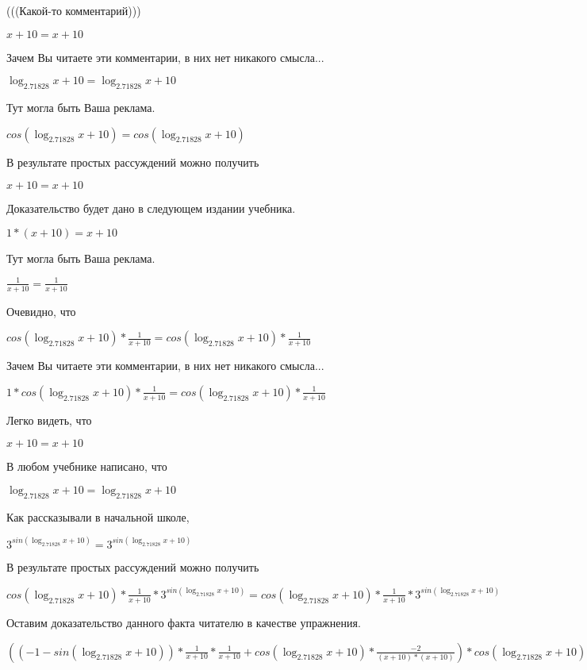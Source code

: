 \documentclass[12pt,a4paper,fleqn]{article}
\theoremstyle{definition}
\begin{document}
(((Какой-то комментарий)))

$ x  +  10  =  x  +  10 $

Зачем Вы читаете эти комментарии, в них нет никакого смысла...

$\log_{ 2.71828 }{ x  +  10 } = \log_{ 2.71828 }{ x  +  10 }$

Тут могла быть Ваша реклама.

$cos(\log_{ 2.71828 }{ x  +  10 }) = cos(\log_{ 2.71828 }{ x  +  10 })$

В результате простых рассуждений можно получить

$ x  +  10  =  x  +  10 $

Доказательство будет дано в следующем издании учебника.

$ 1  * ( x  +  10 ) =  x  +  10 $

Тут могла быть Ваша реклама.

$\frac{ 1 }{ x  +  10 }
 = \frac{ 1 }{ x  +  10 }
$

Очевидно, что

$cos(\log_{ 2.71828 }{ x  +  10 }) * \frac{ 1 }{ x  +  10 }
 = cos(\log_{ 2.71828 }{ x  +  10 }) * \frac{ 1 }{ x  +  10 }
$

Зачем Вы читаете эти комментарии, в них нет никакого смысла...

$ 1  * cos(\log_{ 2.71828 }{ x  +  10 }) * \frac{ 1 }{ x  +  10 }
 = cos(\log_{ 2.71828 }{ x  +  10 }) * \frac{ 1 }{ x  +  10 }
$

Легко видеть, что

$ x  +  10  =  x  +  10 $

В любом учебнике написано, что

$\log_{ 2.71828 }{ x  +  10 } = \log_{ 2.71828 }{ x  +  10 }$

Как рассказывали в начальной школе,

${ 3 }^{sin(\log_{ 2.71828 }{ x  +  10 })} = { 3 }^{sin(\log_{ 2.71828 }{ x  +  10 })}$

В результате простых рассуждений можно получить

$cos(\log_{ 2.71828 }{ x  +  10 }) * \frac{ 1 }{ x  +  10 }
 * { 3 }^{sin(\log_{ 2.71828 }{ x  +  10 })} = cos(\log_{ 2.71828 }{ x  +  10 }) * \frac{ 1 }{ x  +  10 }
 * { 3 }^{sin(\log_{ 2.71828 }{ x  +  10 })}$

Оставим доказательство данного факта читателю в качестве упражнения.

$(( -1  - sin(\log_{ 2.71828 }{ x  +  10 })) * \frac{ 1 }{ x  +  10 }
 * \frac{ 1 }{ x  +  10 }
 + cos(\log_{ 2.71828 }{ x  +  10 }) * \frac{ -2 }{( x  +  10 ) * ( x  +  10 )}
) * cos(\log_{ 2.71828 }{ x  +  10 }) * \frac{ 1 }{ x  +  10 }
 * { 3 }^{sin(\log_{ 2.71828 }{ x  +  10 })} = (( -1  - sin(\log_{ 2.71828 }{ x  +  10 })) * \frac{ 1 }{ x  +  10 }
 * \frac{ 1 }{ x  +  10 }
 + cos(\log_{ 2.71828 }{ x  +  10 }) * \frac{ -2 }{( x  +  10 ) * ( x  +  10 )}
) * cos(\log_{ 2.71828 }{ x  +  10 }) * \frac{ 1 }{ x  +  10 }
 * { 3 }^{sin(\log_{ 2.71828 }{ x  +  10 })}$
\end{document}
